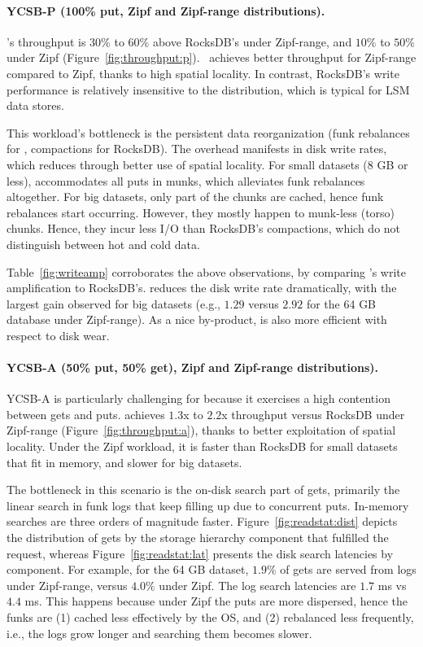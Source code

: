 \paragraph{YCSB-P (100\% put, Zipf and Zipf-range distributions).} 
\sys's throughput is $30\%$ to $60\%$ above RocksDB's under Zipf-range, 
and $10\%$ to $50\%$ under Zipf (Figure~\ref{fig:throughput:p}). 
\sys\ achieves better throughput for Zipf-range compared to Zipf, 
thanks to high spatial locality. In contrast, RocksDB's write performance 
is relatively insensitive to the distribution, which is typical for LSM data stores.

This workload's bottleneck is the persistent data reorganization 
(funk rebalances for \sys, compactions for RocksDB). The overhead
manifests in disk write rates, which \sys\/ reduces through better use of spatial locality. 
For small datasets (8 GB or less), \sys\/ accommodates all puts in munks, which alleviates 
funk rebalances altogether. For big datasets, only part of the chunks are cached, hence 
funk rebalances start occurring. However, they mostly happen to munk-less 
(torso) chunks. Hence, they incur less I/O than RocksDB's compactions, which do not 
distinguish between hot and cold data. 

Table~\ref{fig:writeamp} corroborates the above observations, by comparing 
\sys's write amplification to RocksDB's. \sys\/ reduces the disk write rate dramatically, 
with the largest gain observed for big datasets (e.g., $1.29$ versus $2.92$ for the 64 GB 
database under Zipf-range). As a nice by-product, \sys\/ is also more 
efficient with respect to disk wear.  

\paragraph{YCSB-A (50\% put, 50\% get), Zipf and Zipf-range distributions).}
YCSB-A  is particularly challenging for \sys\/ because it exercises a high contention between gets and puts. 
\sys\/ achieves $1.3$x to $2.2$x throughput versus RocksDB under Zipf-range (Figure~\ref{fig:throughput:a}), 
thanks to better exploitation of spatial locality. Under the Zipf workload, it is faster than RocksDB for small
datasets that fit in memory, and slower for big datasets.  

The bottleneck in this scenario is the on-disk search part of gets, primarily the linear search in funk logs 
that keep filling up due to concurrent puts. In-memory searches are three orders of magnitude 
faster. Figure~\ref{fig:readstat:dist} depicts the distribution of gets by the storage hierarchy component 
that fulfilled the request, whereas Figure~\ref{fig:readstat:lat} presents the disk search latencies by component. 
For example, for the 64 GB dataset, $1.9\%$ of gets are served from logs under Zipf-range, versus $4.0\%$ under Zipf. 
The log search latencies are $1.7$ ms vs $4.4$ ms. This happens because under Zipf the puts are more dispersed, 
hence the funks are (1) cached less effectively by the OS, and (2) rebalanced less frequently, i.e., the logs grow longer
and searching them becomes slower. 

